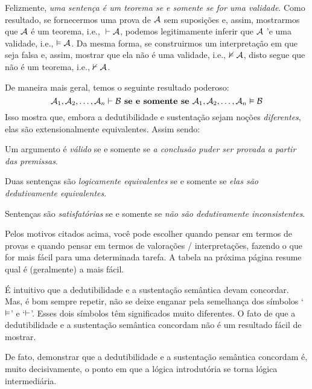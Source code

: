 Felizmente, \emph{uma senten\c ca \'e um teorema se e somente se for uma validade}. Como resultado, se fornecermos uma prova de $\mathcal{A}$ sem suposi\c c\~oes e, assim, mostrarmos que $\mathcal{A}$ \'e um teorema, i.e., ${}\vdash \mathcal{A}$, podemos legitimamente inferir que $\mathcal{A}$ 'e uma validade, i.e., $\vDash\mathcal{A}$. Da mesma forma, se construirmos um interpreta\c c\~ao em que  seja falsa e, assim, mostrar que ela n\~ao \'e uma validade, i.e., $\nvDash \mathcal{A}$, disto  segue que  n\~ao \'e um teorema, i.e.,  $\nvdash \mathcal{A}$.

De maneira mais geral, temos o seguinte resultado poderoso:
$$\mathcal{A}_1, \mathcal{A}_2, \ldots, \mathcal{A}_n \vdash\mathcal{B} \textbf{ se e somente se }\mathcal{A}_1, \mathcal{A}_2, \ldots, \mathcal{A}_n \vDash\mathcal{B}$$
Isso mostra que, embora a dedutibilidade e sustenta\c c\~ao sejam no\c c\~oes \emph{diferentes}, elas s\~ao extensionalmente equivalentes. Assim sendo:
	\begin{ebullet}
		\item Um argumento \'e \emph{v\'alido} se e somente se \emph{a conclus\~ao puder ser provada a partir das premissas}.
		\item Duas senten\c cas s\~ao \emph{logicamente equivalentes} se e somente se \emph{elas s\~ao dedutivamente equivalentes}.
		\item Senten\c cas s\~ao \emph{satisfat\'orias} se e somente se  \emph{n\~ao s\~ao dedutivamente inconsistentes}.
	\end{ebullet}
 
Pelos  motivos citados acima, voc\^e pode escolher quando pensar em termos de provas e quando pensar em termos de valora\c c\~oes / interpreta\c c\~oes, fazendo o que for mais f\'acil para uma determinada tarefa. A tabela na pr\'oxima p\'agina resume qual \'e (geralmente) a mais f\'acil.

\'E intuitivo que a dedutibilidade e a sustenta\c c\~ao sem\^antica devam concordar. Mas, \'e bom sempre repetir, n\~ao se deixe enganar pela semelhan\c ca dos s\'imbolos `$\vDash$' e `$\vdash$'. Esses dois s\'imbolos t\^em significados muito diferentes. O fato de que a dedutibilidade  e a sustenta\c c\~ao sem\^antica concordam n\~ao \'e um resultado f\'acil de mostrar. 

De fato, demonstrar que a dedutibilidade e a sustenta\c c\~ao sem\^antica concordam \'e, muito decisivamente, o ponto em que a l\'ogica introdut\'oria se torna l\'ogica intermedi\'aria.


